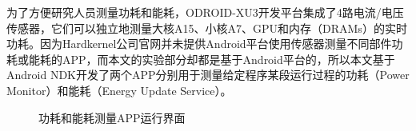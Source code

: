 为了方便研究人员测量功耗和能耗，ODROID-XU3开发平台集成了4路电流/电压传感器，它们可以独立地测量大核A15、小核A7、GPU和内存（DRAMs）的实时功耗。因为Hardkernel公司官网并未提供Android平台使用传感器测量不同部件功耗或能耗的APP，而本文的实验部分却都是基于Android平台的，所以本文基于Android NDK开发了两个APP分别用于测量给定程序某段运行过程的功耗（Power Monitor）和能耗（Energy Update Service）。

\begin{figure}[htbp]
\centering
{}
\caption{功耗和能耗测量APP运行界面}
\label{fig:subfig}
\end{figure}


